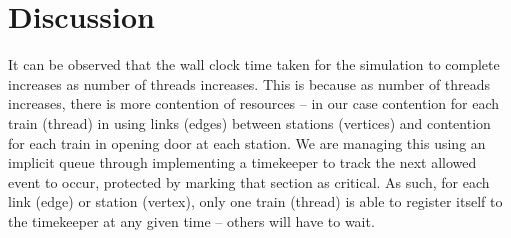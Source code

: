 \documentclass[a4paper,12pt]{article}
\begin{document}



\section{Discussion}
It can be observed that the wall clock time taken for the simulation to complete increases as number of threads increases. This is because as number of threads increases, there is more contention of resources -- in our case contention for each train (thread) in using links (edges) between stations (vertices) and contention for each train in opening door at each station. We are managing this using an implicit queue through implementing a timekeeper to track the next allowed event to occur, protected by marking that section as critical. As such, for each link (edge) or station (vertex), only one train (thread) is able to register itself to the timekeeper at any given time -- others will have to wait.
\end{document}
